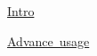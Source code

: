 
\begin{DoxyItemize}
\item \mbox{\hyperlink{intro}{Intro}}
\item \mbox{\hyperlink{advanced}{Advance usage}} 
\end{DoxyItemize}